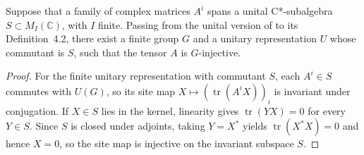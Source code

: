 \begin{lemma}%
    \label{thm:peps_cstar_span_g_injective_mps}
    \leanok
    Suppose that a family of complex matrices $A^i$ spans a unital
    C*-subalgebra $S\subset M_I(\mathbb C)$, with $I$ finite.
    Passing from the unital version of \cite[Theorem~4.1]{Schuch2010PEPS}
    \cite{gap:scp10_finite_group_commutant_unital} to its Definition~4.2,
    there exist a finite group $G$ and a unitary representation $U$ whose
    commutant is $S$, such that the tensor $A$ is $G$-injective.
\end{lemma}

\begin{proof}\leanok
    For the finite unitary representation with commutant $S$,
    each $A^i\in S$ commutes with $U(G)$, so its site map
    $X\mapsto (\operatorname{tr}(A^iX))_i$ is invariant under conjugation.
    If $X\in S$ lies in the kernel, linearity gives
    $\operatorname{tr}(YX)=0$ for every $Y\in S$.
    Since $S$ is closed under adjoints, taking $Y=X^*$ yields
    $\operatorname{tr}(X^*X)=0$ and hence $X=0$,
    so the site map is injective on the invariant subspace $S$.
\end{proof}
